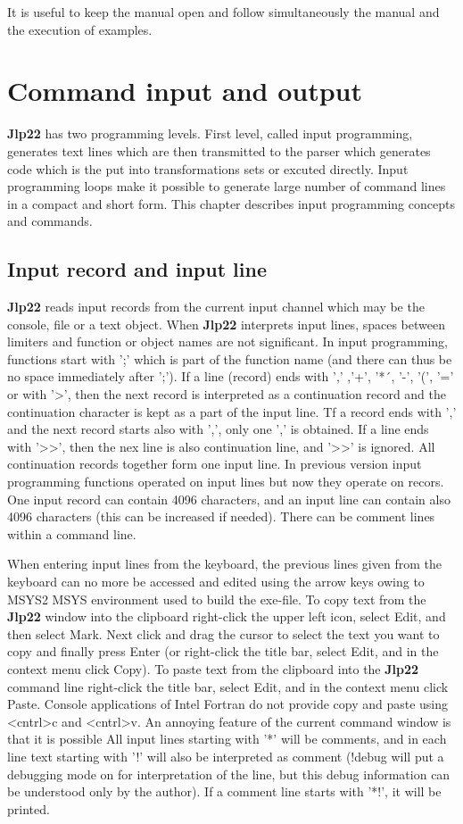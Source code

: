 It is useful to keep the manual open and follow simultaneously the manual and the execution of examples. 
 
 
 
\section{Command input and output} 
\label{cominout} 
\textbf{Jlp22} has two programming levels. First level, called input programming, generates text lines which are then 
transmitted to the parser which generates code which is the put into transformations sets or 
excuted directly. Input programming loops make it possible to generate large number of command lines 
in a compact and short form. This chapter describes input programming concepts and commands. 
\subsection{Input record and input line} 
\label{inpuline} 
\textbf{Jlp22} reads input records from the current input channel which may be the console, file or a text object. 
When \textbf{Jlp22} interprets input lines, spaces between limiters and function or object names are not 
significant. In input programming, functions start with ';' which is part of the function name (and 
there can thus be no space immediately after ';'). If a line (record) ends with ',' ,'+', '*´, '-', 
'(', '=' or with '>', then the next record is interpreted as a continuation record and 
the continuation character is kept as a part of the input 
line. Tf a record ends with ',' and the next record starts also with ',', only one ',' is obtained. If a line ends with '>{}>', then 
the nex line is also continuation line, and  '>{}>' is ignored. All continuation 
records together form one input line. In previous version input programming functions operated on input lines 
but now they operate on recors. One input record can contain 4096 characters, and an input line can contain also 4096 characters 
(this can be increased if needed). 
There can be comment lines within a command line. 
 
When entering input lines from the keyboard, the previous lines given from the keyboard can no more be 
accessed and edited using the arrow keys owing to MSYS2 MSYS environment used to build the exe-file. 
To copy text from the \textbf{Jlp22} window into the clipboard right-click the upper left icon, select Edit, 
and then select Mark. Next click and drag the cursor to select the text you want to copy and 
finally press Enter (or right-click the title bar, select Edit, and in the context menu click Copy). 
To paste text from the clipboard into the \textbf{Jlp22} command line right-click the title bar, select Edit, 
and in the context menu click Paste. Console applications of Intel Fortran do not provide copy 
and paste using <cntrl>c and <cntrl>v. An annoying feature of the current command window is that it is possible 
All input lines starting with '*' will be comments, and in each line text starting with '!' will also 
be interpreted as comment (!debug will put a debugging mode on for interpretation of the 
line, but this debug information can be understood only by the author). If a comment line starts 
with '*!', it will be printed. 
